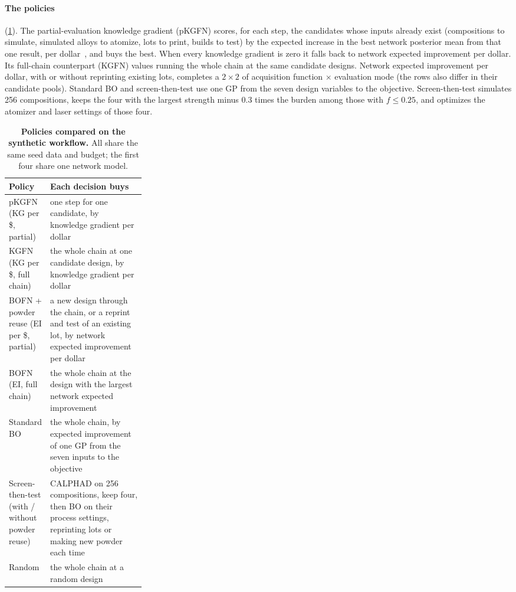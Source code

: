 \documentclass[11pt]{article}
\let\cite\autocite
\begin{document}
\paragraph{The policies} (\cref{tabS:policies}). The partial-evaluation
knowledge gradient (pKGFN) scores, for each step, the candidates whose inputs
already exist (compositions to simulate, simulated alloys to atomize, lots to
print, builds to test) by the expected increase in the best network posterior
mean from that one result, per dollar~\cite{buathong2024}, and buys the best.
When every knowledge gradient is zero it falls back to network expected
improvement per dollar. Its full-chain counterpart (KGFN) values running the
whole chain at the same candidate designs. Network expected improvement per
dollar, with or without reprinting existing lots, completes a $2\times2$ of
acquisition function $\times$ evaluation mode (the rows also differ in their
candidate pools). Standard BO and screen-then-test use one GP from the seven
design variables to the objective. Screen-then-test simulates 256 compositions,
keeps the four with the largest strength minus 0.3 times the burden among those
with $f\le0.25$, and optimizes the atomizer and laser settings of those four.

\begin{table}[t]
\centering
\small
\caption{\textbf{Policies compared on the synthetic workflow.} All share the same
seed data and budget; the first four share one network model.}
\label{tabS:policies}
\begin{tabularx}{\linewidth}{@{}>{\raggedright\arraybackslash}p{0.27\linewidth}X@{}}
\toprule
Policy & Each decision buys \\
\midrule
pKGFN (KG per \$, partial) & one step for one candidate, by knowledge gradient per dollar \\
KGFN (KG per \$, full chain) & the whole chain at one candidate design, by knowledge gradient per dollar \\
BOFN + powder reuse (EI per \$, partial) & a new design through the chain, or a reprint and test of an existing lot, by network expected improvement per dollar \\
BOFN (EI, full chain) & the whole chain at the design with the largest network expected improvement \\
Standard BO & the whole chain, by expected improvement of one GP from the seven inputs to the objective \\
Screen-then-test (with / without powder reuse) & CALPHAD on 256 compositions, keep four, then BO on their process settings, reprinting lots or making new powder each time \\
Random & the whole chain at a random design \\
\bottomrule
\end{tabularx}
\end{table}
\end{document}
